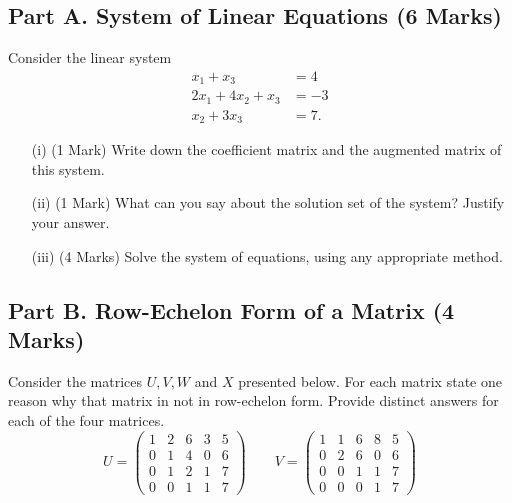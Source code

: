 \documentclass[a4paper,12pt]{article}
\begin{document}
	\subsection*{Part A. System of Linear Equations (6 Marks)}
 Consider the linear system
		\begin{align*}
		x_1 + x_3 &= 4\\
		2x_1 + 4x_2 + x_3 &= -3\\
		x_2 + 3x_3 &= 7.
		\end{align*}
		\begin{itemize}
			\item[(i)] (1 Mark) Write down the coefficient matrix and the augmented matrix of this system. %
			
			\item[(ii)] (1 Mark) What can you say about the solution set of the system? Justify your answer. %
			
			\item[(iii)] (4 Marks) Solve the system of equations, using any appropriate method. %
		\end{itemize}

\subsection*{Part B. Row-Echelon Form of a Matrix (4 Marks)}
Consider the matrices $U,V,W$ and $X$ presented below. For each matrix state one reason why that matrix in not in row-echelon form. Provide distinct answers for each of the four matrices.
\[
U = \begin{pmatrix}
1&2 & 6  &3 & 5
\\  0&1&4 &0 & 6
\\  0&1&2 &1 & 7
\\  0&0&1 &1 & 7
\end{pmatrix} \qquad  V = \begin{pmatrix}
1&1 & 6  &8 & 5
\\  0&2&6 &0 & 6
\\  0&0&1 &1 & 7
\\  0&0&0 &1 & 7
\end{pmatrix}
\]
\end{document}
